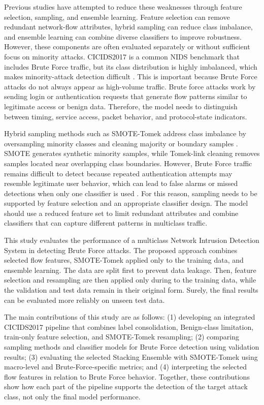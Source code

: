 \documentclass[12pt,a4paper]{article}
\begin{document}
Previous studies have attempted to reduce these weaknesses through feature selection, sampling, and ensemble learning. Feature selection can remove redundant network-flow attributes, hybrid sampling can reduce class imbalance, and ensemble learning can combine diverse classifiers to improve robustness. However, these components are often evaluated separately or without sufficient focus on minority attacks. CICIDS2017 is a common NIDS benchmark that includes Brute Force traffic, but its class distribution is highly imbalanced, which makes minority-attack detection difficult \parencite{harini2023minority,irfaissurur2025web,khan2024balanced,le2024unbalanced}. This is important because Brute Force attacks do not always appear as high-volume traffic. Brute force attacks work by sending login or authentication requests that generate flow patterns similar to legitimate access or benign data. Therefore, the model needs to distinguish between timing, service access, packet behavior, and protocol-state indicators.

Hybrid sampling methods such as SMOTE-Tomek address class imbalance by oversampling minority classes and cleaning majority or boundary samples \parencite{khan2024balanced,le2024unbalanced,nassreddine2025ensemble}. SMOTE generates synthetic minority samples, while Tomek-link cleaning removes samples located near overlapping class boundaries. However, Brute Force traffic remains difficult to detect because repeated authentication attempts may resemble legitimate user behavior, which can lead to false alarms or missed detections when only one classifier is used \parencite{rihan2023iot,irfaissurur2025web}. For this reason, sampling needs to be supported by feature selection and an appropriate classifier design. The model should use a reduced feature set to limit redundant attributes and combine classifiers that can capture different patterns in multiclass traffic.

This study evaluates the performance of a multiclass Network Intrusion Detection System in detecting Brute Force attacks. The proposed approach combines selected flow features, SMOTE-Tomek applied only to the training data, and ensemble learning. The data are split first to prevent data leakage. Then, feature selection and resampling are then applied only during to the training data, while the validation and test data remain in their original form. Surely, the final results can be evaluated more reliably on unseen test data.

The main contributions of this study are as follows: (1) developing an integrated CICIDS2017 pipeline that combines label consolidation, Benign-class limitation, train-only feature selection, and SMOTE-Tomek resampling; (2) comparing sampling methods and classifier models for Brute Force detection using validation results; (3) evaluating the selected Stacking Ensemble with SMOTE-Tomek using macro-level and Brute-Force-specific metrics; and (4) interpreting the selected flow features in relation to Brute Force behavior. Together, these contributions show how each part of the pipeline supports the detection of the target attack class, not only the final model performance.
\end{document}
